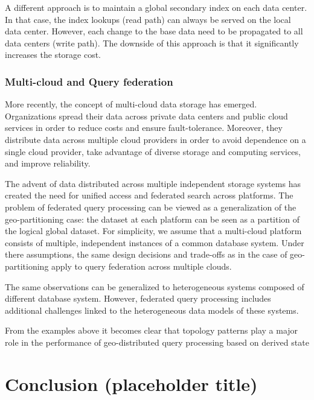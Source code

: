 A different approach is to maintain a global secondary index on each data center.
In that case, the index lookups (read path) can always be served on the local data center.
However, each change to the base data need to be propagated to all data centers (write path).
The downside of this approach is that it significantly increases the storage cost.

\subsubsection{Multi-cloud and Query federation}
More recently, the concept of multi-cloud data storage has emerged.
Organizations spread their data across private data centers and public cloud services in order to reduce costs and
ensure fault-tolerance.
Moreover, they distribute data across multiple cloud providers in order to avoid dependence on a single
cloud provider, take advantage of diverse storage and computing services, and improve reliability.

The advent of data distributed across multiple independent storage systems has created the need for unified access and
federated search across platforms.
The problem of federated query processing can be viewed as a generalization of the geo-partitioning case:
the dataset at each platform can be seen as a partition of the logical global dataset.
For simplicity, we assume that a multi-cloud platform consists of multiple, independent instances of a common database
system.
Under there assumptions, the same design decisions and trade-offs as in the case of geo-partitioning apply to query
federation across multiple clouds.

The same observations can be generalized to heterogeneous systems composed of different database system.
However, federated query processing includes additional challenges linked to the heterogeneous data models of these
systems.

\bigskip

From the examples above it becomes clear that topology patterns play a major role in the performance of geo-distributed
query processing based on derived state

\section{Conclusion (placeholder title)}


